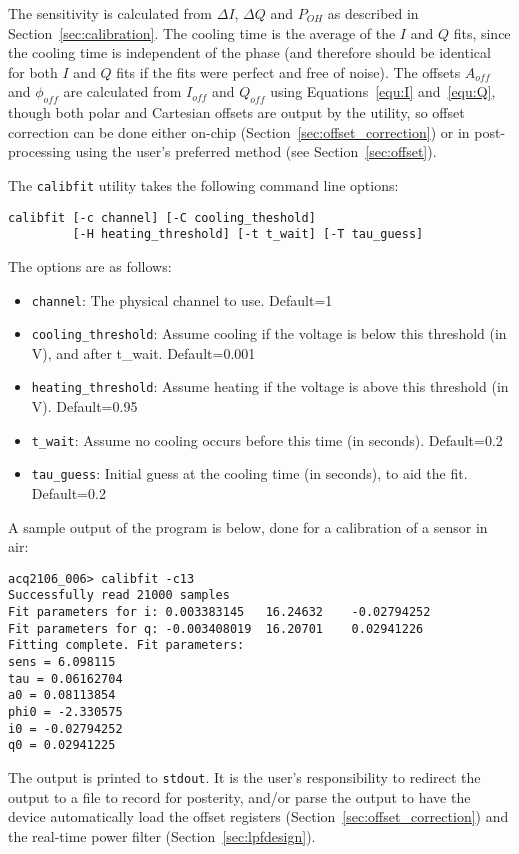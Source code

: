 \documentclass[12pt,a4paper]{article}
\begin{document}
The sensitivity is calculated from $\Delta I$, $\Delta Q$ and $P_{OH}$ as described in Section~\ref{sec:calibration}. The cooling time is the average
of the $I$ and $Q$ fits, since the cooling time is independent of the phase (and therefore should be identical for both $I$ and $Q$ fits if the fits
were perfect and free of noise). The offsets $A_{off}$ and $\phi_{off}$ are calculated from $I_{off}$ and $Q_{off}$ using Equations~\ref{equ:I}
and~\ref{equ:Q}, though both polar and Cartesian offsets are output by the utility, so offset correction can be done either on-chip
(Section~\ref{sec:offset_correction}) or in post-processing using the user's preferred method (see Section~\ref{sec:offset}).

The \texttt{calibfit} utility takes the following command line options:
\begin{verbatim}
calibfit [-c channel] [-C cooling_theshold]
         [-H heating_threshold] [-t t_wait] [-T tau_guess]
\end{verbatim}
The options are as follows:
\begin{itemize}
\item{\texttt{channel}: The physical channel to use. Default=1}
\item{\texttt{cooling\_threshold}: Assume cooling if the voltage is below this threshold (in V), and after t\_wait. Default=0.001}
\item{\texttt{heating\_threshold}: Assume heating if the voltage is above this threshold (in V). Default=0.95}
\item{\texttt{t\_wait}: Assume no cooling occurs before this time (in seconds). Default=0.2}
\item{\texttt{tau\_guess}: Initial guess at the cooling time (in seconds), to aid the fit. Default=0.2}
\end{itemize}

A sample output of the program is below, done for a calibration of a sensor in air:
\begin{verbatim}
acq2106_006> calibfit -c13
Successfully read 21000 samples
Fit parameters for i: 0.003383145	16.24632	-0.02794252
Fit parameters for q: -0.003408019	16.20701	0.02941226
Fitting complete. Fit parameters:
sens = 6.098115
tau = 0.06162704
a0 = 0.08113854
phi0 = -2.330575
i0 = -0.02794252
q0 = 0.02941225
\end{verbatim}
The output is printed to \texttt{stdout}. It is the user's responsibility to redirect the output to a file to record for posterity, and/or parse the
output to have the device automatically load the offset registers (Section~\ref{sec:offset_correction}) and the real-time power filter
(Section~\ref{sec:lpfdesign}).
\end{document}
